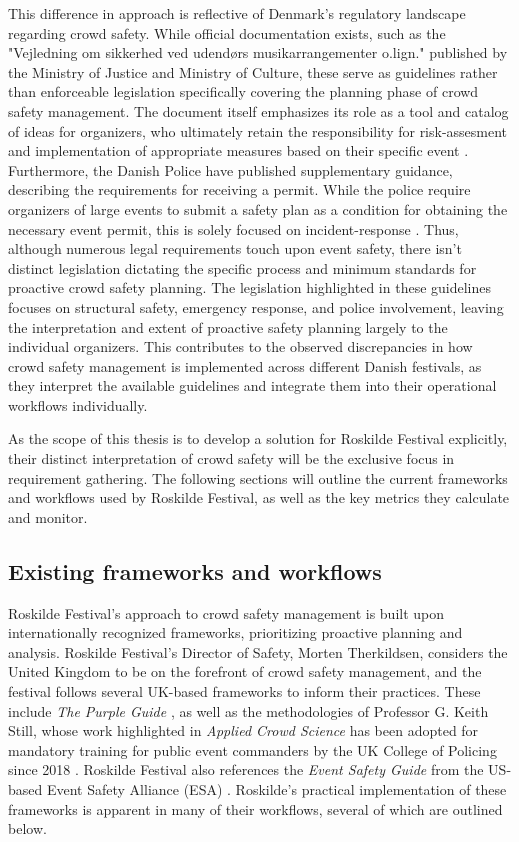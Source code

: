 This difference in approach is reflective of Denmark's regulatory landscape regarding crowd safety. While official documentation exists, such as the "Vejledning om sikkerhed ved udendørs musikarrangementer o.lign." published by the Ministry of Justice and Ministry of Culture, these serve as guidelines rather than enforceable legislation specifically covering the planning phase of crowd safety management. The document itself emphasizes its role as a tool and catalog of ideas for organizers, who ultimately retain the responsibility for risk-assesment and implementation of appropriate measures based on their specific event \cite{jm_safety}. Furthermore, the Danish Police have published supplementary guidance, describing the requirements for receiving a permit. While the police require organizers of large events to submit a safety plan as a condition for obtaining the necessary event permit, this is solely focused on incident-response \cite{police_safety}. Thus, although numerous legal requirements touch upon event safety, there isn't distinct legislation dictating the specific process and minimum standards for proactive crowd safety planning. The legislation highlighted in these guidelines focuses on structural safety, emergency response, and police involvement, leaving the interpretation and extent of proactive safety planning largely to the individual organizers. This contributes to the observed discrepancies in how crowd safety management is implemented across different Danish festivals, as they interpret the available guidelines and integrate them into their operational workflows individually.

As the scope of this thesis is to develop a solution for Roskilde Festival explicitly, their distinct interpretation of crowd safety will be the exclusive focus in requirement gathering. The following sections will outline the current frameworks and workflows used by Roskilde Festival, as well as the key metrics they calculate and monitor.


\subsection{Existing frameworks and workflows}
\label{sec:existing-frameworks}

Roskilde Festival's approach to crowd safety management is built upon internationally recognized frameworks, prioritizing proactive planning and analysis. Roskilde Festival's Director of Safety, Morten Therkildsen, considers the United Kingdom to be on the forefront of crowd safety management, and the festival follows several UK-based frameworks to inform their practices. These include \textit{The Purple Guide} \cite{purple_guide}, as well as the methodologies of Professor G. Keith Still, whose work highlighted in \textit{Applied Crowd Science} has been adopted for mandatory training for public event commanders by the UK College of Policing since 2018 \cite{keith_still}. Roskilde Festival also references the \textit{Event Safety Guide} from the US-based Event Safety Alliance (ESA) \cite{es_guide}. Roskilde's practical implementation of these frameworks is apparent in many of their workflows, several of which are outlined below.

